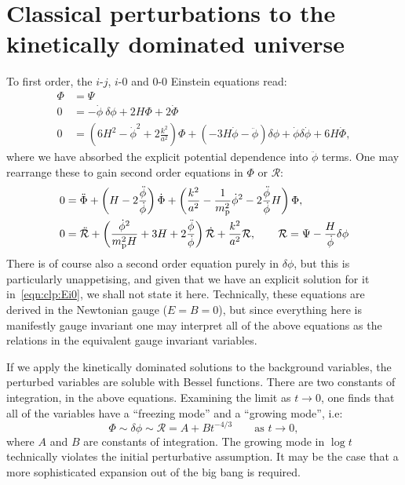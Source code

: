 \chapter{Classical perturbations to the kinetically dominated universe}
\label{chap:cls}


To first order, the $i$-$j$, $i$-$0$ and $0$-$0$ Einstein equations read:
\begin{align}
  \Phi &= \Psi 
  \label{eqn:clp:Eij} \\
  0 &= -\dot{\phi}\:\delta\phi  + 2 H \Phi + 2 \dot{\Phi} 
  \label{eqn:clp:Ei0}\\
  0 &= \left(6H^2-\dot{\phi}^2 + 2\frac{k^2}{a^2}\right)\Phi  + \left( -3H\dot{\phi} - \ddot{\phi} \right)\delta\phi + \dot{\phi}\delta\dot{\phi} +  6 H \dot{\Phi},
  \label{eqn:clp:E00}
\end{align}
where we have absorbed the explicit potential dependence into $\ddot{\phi}$ terms. 
One may rearrange these to gain second order equations in $\Phi$ or $\mathcal{R}$:
\begin{align}
  0 &= \ddot{\Phi} + \left( H - 2 \frac{\ddot{\phi}}{\dot{\phi}} \right) \dot{\Phi} + \left( \frac{k^2}{a^2}-\frac{1}{m_{\mathrm{p}}^2}\dot{\phi}^2 - 2\frac{\ddot{\phi}}{\dot{\phi}}H \right)\Phi, \\
  0 &= \ddot{\mathcal{R}} + \left( \frac{\dot{\phi}^2}{m_{\mathrm{p}}^2H} + 3H + 2\frac{\ddot{\phi}}{\dot{\phi}} \right)\dot{\mathcal{R}} + \frac{k^2}{a^2}\mathcal{R}, \qquad \mathcal{R} = \Psi - \frac{H}{\dot{\phi}}\delta\phi
\end{align}
There is of course also a second order equation purely in $\delta\phi$, but this is particularly unappetising, and given that we have an explicit solution for it in~\eqref{eqn:clp:Ei0}, we shall not state it here.
Technically, these equations are derived in the Newtonian gauge ($E=B=0$), but since everything here is manifestly gauge invariant one may interpret all of the above equations as the relations in the equivalent gauge invariant variables.

If we apply the kinetically dominated solutions to the background variables, the perturbed variables are soluble with Bessel functions. There are two constants of integration, in the above equations. Examining the limit as $t\to 0$, one finds that all of the variables have a ``freezing mode'' and a ``growing mode'', i.e:
\begin{equation}
  \Phi\sim \delta\phi \sim \mathcal{R} = A + B t^{-4/3} \qquad \text{as } t\rightarrow 0,
\end{equation}
where $A$ and $B$ are constants of integration.
The growing mode in $\log t$ technically violates the initial perturbative assumption. It may be the case that a more sophisticated expansion out of the big bang is required.

